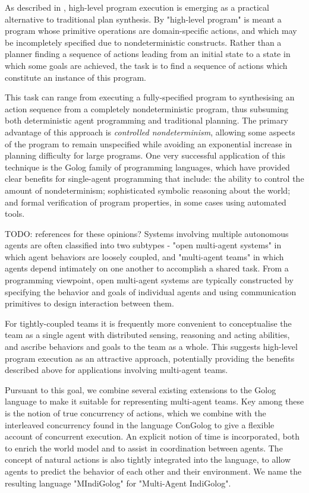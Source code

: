 \documentclass{llncs}
\begin{document}
As described in \cite{giacomo99indigolog}, high-level program execution
is emerging as a practical alternative to traditional plan
synthesis. By "high-level program" is meant a program whose
primitive operations are domain-specific actions, and which may be
incompletely specified due to nondeterministic constructs. Rather
than a planner finding a sequence of actions leading from an initial
state to a state in which some goals are achieved, the task is to
find a sequence of actions which constitute an instance of this program.

This task can range from executing a fully-specified program to synthesising
an action sequence from a completely nondeterministic program, thus
subsuming both deterministic agent programming and traditional planning.
The primary advantage of this approach is \emph{controlled nondeterminism},
allowing some aspects of the program to remain unspecified while avoiding
an exponential increase in planning difficulty for large programs.
One very successful application of this technique is the Golog \cite{levesque97golog}
family of programming languages, which have provided clear benefits
for single-agent programming that include: the ability to control
the amount of nondeterminism; sophisticated symbolic reasoning about
the world; and formal verification of program properties, in some
cases using automated tools.

TODO: references for these opinions? Systems involving multiple autonomous
agents are often classified into two subtypes - "open multi-agent
systems" in which agent behaviors are loosely coupled, and "multi-agent
teams" in which agents depend intimately on one another to accomplish
a shared task. From a programming viewpoint, open multi-agent systems
are typically constructed by specifying the behavior and goals of
individual agents and using communication primitives to design interaction
between them.

For tightly-coupled teams it is frequently more convenient to conceptualise
the team as a single agent with distributed sensing, reasoning and
acting abilities, and ascribe behaviors and goals to the team as a
whole. This suggests high-level program execution as an attractive
approach, potentially providing the benefits described above for applications
involving multi-agent teams.

Pursuant to this goal, we combine several existing extensions to the
Golog language to make it suitable for representing multi-agent teams.
Key among these is the notion of true concurrency of actions, which
we combine with the interleaved concurrency found in the language
ConGolog \cite{giacomo00congolog} to give a flexible account of concurrent
execution. An explicit notion of time is incorporated, both to enrich
the world model and to assist in coordination between agents. The
concept of natural actions \cite{reiter96sc_nat_conc} is also tightly
integrated into the language, to allow agents to predict the behavior
of each other and their environment. We name the resulting language
"MIndiGolog" for "Multi-Agent IndiGolog".
\end{document}
